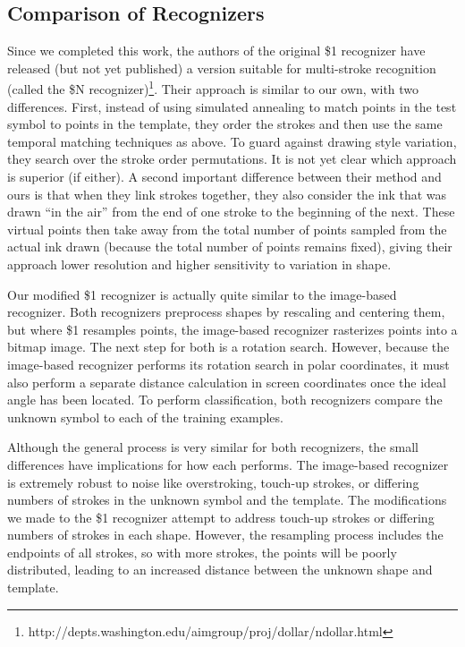 \documentclass[final,5p,twocolumn]{elsarticle}
\begin{document}
\subsection{Comparison of Recognizers}
Since we completed this work, the authors of the original \$1
recognizer have released (but not yet published) a version suitable
for multi-stroke recognition (called the \$N
recognizer)\footnote{http://depts.washington.edu/aimgroup/proj/dollar/ndollar.html}.
Their approach is similar to our own, with two differences.  First,
instead of using simulated annealing to match points in the test
symbol to points in the template, they order the strokes and then use
the same temporal matching techniques as above.  To guard against
drawing style variation, they search over the stroke order
permutations.  It is not yet clear which approach is superior (if
either).  A second important difference between their method and ours
is that when they link strokes together, they also consider the ink
that was drawn ``in the air'' from the end of one stroke to the
beginning of the next.  These virtual points then take away from the
total number of points sampled from the actual ink drawn (because the
total number of points remains fixed), giving their approach lower
resolution and higher sensitivity to variation in shape.

Our modified \$1 recognizer is actually quite similar to the
image-based recognizer. Both recognizers preprocess shapes by
rescaling and centering them, but where \$1 resamples points, the
image-based recognizer rasterizes points into a bitmap image. The next
step for both is a rotation search. However, because the image-based
recognizer performs its rotation search in polar coordinates, it must
also perform a separate distance calculation in screen coordinates
once the ideal angle has been located. To perform classification, both
recognizers compare the unknown symbol to each of the training
examples.

Although the general process is very similar for both recognizers, the
small differences have implications for how each performs. The
image-based recognizer is extremely robust to noise like overstroking,
touch-up strokes, or differing numbers of strokes in the unknown
symbol and the template. The modifications we made to the \$1
recognizer attempt to address touch-up strokes or differing numbers of
strokes in each shape. However, the resampling process includes the
endpoints of all strokes, so with more strokes, the points will be
poorly distributed, leading to an increased distance between the
unknown shape and template.
\end{document}
